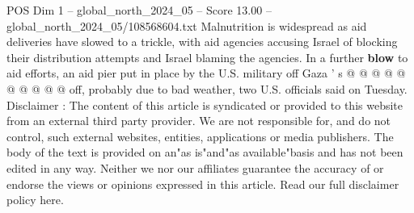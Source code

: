 \begin{textsample}{POS Dim 1 – global\_north\_2024\_05 – Score 13.00 – global\_north\_2024\_05/108568604.txt}
Malnutrition is widespread as aid deliveries have slowed to a trickle, with aid agencies accusing Israel of blocking their distribution attempts and Israel blaming the agencies.
In a further \textbf{blow} to aid efforts, an aid pier put in place by the U.S. military off Gaza ' s @ @ @ @ @ @ @ @ @ @ off, probably due to bad weather, two U.S. officials said on Tuesday.
Disclaimer : The content of this article is syndicated or provided to this website from an external third party provider.
We are not responsible for, and do not control, such external websites, entities, applications or media publishers.
The body of the text is provided on an"as is"and"as available"basis and has not been edited in any way.
Neither we nor our affiliates guarantee the accuracy of or endorse the views or opinions expressed in this article.
Read our full disclaimer policy here.

\end{textsample}
